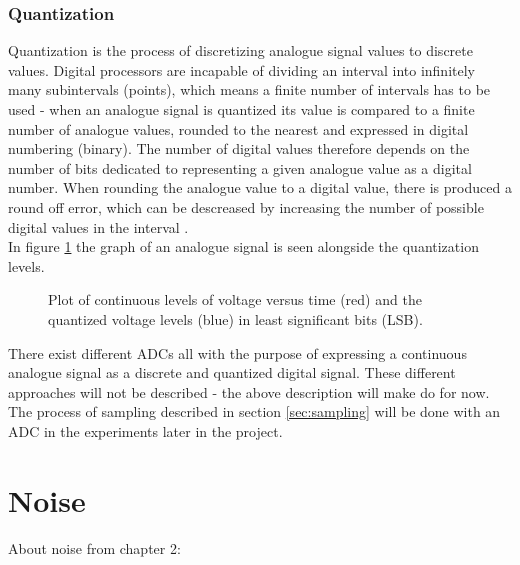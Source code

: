 \subsubsection{Quantization}
Quantization is the process of discretizing analogue signal values to discrete values. Digital processors are incapable of dividing an interval into infinitely many subintervals (points), which means a finite number of intervals has to be used -  when an analogue signal is quantized its value is compared to a finite number of analogue values, rounded to the nearest and expressed in digital numbering (binary). The number of digital values therefore depends on the number of bits dedicated to representing a given analogue value as a digital number. When rounding the analogue value to a digital value, there is produced a round off error, which can be descreased by increasing the number of possible digital values in the interval \cite{pelgrom}.\\
In figure \ref{fig:quant} the graph of an analogue signal is seen alongside the quantization levels.
\begin{figure}[H]
\centering
{}
\caption{Plot of continuous levels of voltage versus time (red) and the quantized voltage levels (blue) in least significant bits (LSB).}
\label{fig:quant}
\end{figure}
\noindent There exist different ADCs \cite{pelgrom} all with the purpose of expressing a continuous analogue signal as a discrete and quantized digital signal. These different approaches will  not be described - the above description will make do for now. The process of sampling described in section \ref{sec:sampling} will be done with an ADC in the experiments later in the project.

\clearpage
\section{Noise}
About noise from chapter 2: \textregistered

